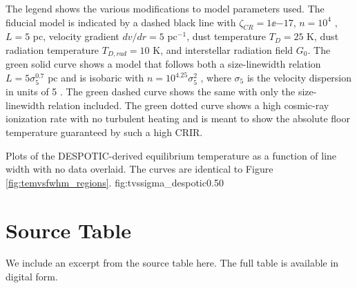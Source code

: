 The legend shows the various modifications to model parameters used.  The
fiducial model is indicated by a dashed black line with $\zeta_{CR} =
1\ee{-17}$, $n=10^4$ \percc, $L=5$ pc, velocity gradient $dv/dr=5$ \kms
pc$^{-1}$, dust temperature $T_D=25$ K, dust radiation temperature $T_{D,rad} =
10$ K, and interstellar radiation field $G_0$.  The green solid curve shows a
model that follows both a size-linewidth relation $L=5 \sigma_5^{0.7}$ pc and
is isobaric with $n=10^{4.25} \sigma_5^2$ \percc, where $\sigma_5$ is the
velocity dispersion in units of 5 \kms.  The green dashed curve shows the same
with only the size-linewidth relation included.  The green dotted curve shows a
high cosmic-ray ionization rate with no turbulent heating and is meant to show
the absolute floor temperature guaranteed by such a high CRIR.


{Plots of the DESPOTIC-derived equilibrium temperature as a function of line
width with no data overlaid.  The curves are identical to Figure
\ref{fig:temvsfwhm_regions}.}
{fig:tvssigma_despotic}{0.5}{0}

\section{Source Table}
We include an excerpt from the source table here.  The full table is available
in digital form.







